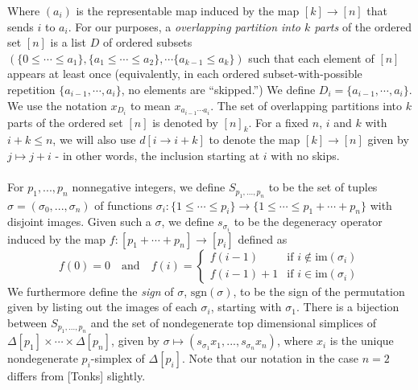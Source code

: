 \documentclass[12pt]{article}
\theoremstyle{definition}
\begin{document}
Where $(a_i)$ is the representable map induced by the map $[k] \to [n]$ that sends $i$ to $a_i$. For our purposes, a \emph{overlapping partition into $k$ parts} of the ordered set $[n]$ is a list $D$ of ordered subsets $(\{0 \le \cdots \le a_1\}, \{a_1 \le \cdots \le a_2\}, \cdots \{a_{k-1} \le a_k\})$ such that each element of $[n]$ appears at least once (equivalently, in each ordered subset-with-possible repetition $\{a_{i-1}, \cdots, a_i\}$, no elements are ``skipped.'') We define $D_i = \{a_{i-1}, \cdots, a_i\}$. We use the notation $x_{D_i}$ to mean $x_{a_{i-1}\cdots a_i}$. The set of overlapping partitions into $k$ parts of the ordered set $[n]$ is denoted by $[n]_k$. For a fixed $n$, $i$ and $k$ with $i + k \le n$, we will also use $d[i \to i + k]$ to denote the map $[k] \to [n]$ given by $j \mapsto j + i$ - in other words, the inclusion starting at $i$ with no skips.
\\\\
For $p_1,...,p_n$ nonnegative integers, we define $S_{p_1,...,p_n}$ to be the set of tuples $\sigma = (\sigma_0,...,\sigma_n)$ of functions $\sigma_i : \{1 \le \cdots \le p_i\} \to \{1 \le \cdots \le p_1 + \cdots + p_n\}$ with disjoint images. 
Given such a $\sigma$, we define $s_{\sigma_i}$ to be the degeneracy operator induced by the map $f: [p_1 + \cdots + p_n] \to [p_i]$ defined as 
$$ f(0) = 0 \quad \text{and} \quad f(i) =  
\begin{cases}
f(i-1) & \text{if } i \not \in \text{im}(\sigma_i) \\
f(i-1) + 1 & \text{if } i \in \text{im}(\sigma_i)
\end{cases}$$
We furthermore define the \textit{sign} of $\sigma$, $\text{sgn}(\sigma)$, to be the sign of the permutation given by listing out the images of each $\sigma_i$, starting with $\sigma_1$. 
There is a bijection between $S_{p_1,...,p_n}$  and the set of nondegenerate top dimensional simplices of $\Delta[p_1] \times \cdots \times \Delta[p_n]$, given by $\sigma \mapsto (s_{\sigma_1} x_1,...,s_{\sigma_n} x_n)$, where $x_i$ is the unique nondegenerate $p_i$-simplex of $\Delta[p_i]$. 
Note that our notation in the case $n=2$ differs from [Tonks] slightly.
\\\\
\end{document}
